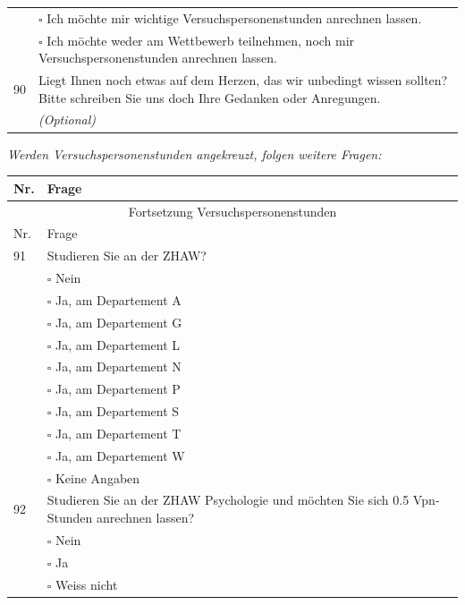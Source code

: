 \begin{flushleft}
\begin{longtable}[c]{ |p{1em}|p{35em}|}
  & $\square$ Ich möchte mir wichtige Versuchspersonenstunden anrechnen lassen.\\
  
  & $\square$ Ich möchte weder am Wettbewerb teilnehmen, noch mir Versuchspersonenstunden anrechnen lassen.\\
  
  90 & Liegt Ihnen noch etwas auf dem Herzen, das wir unbedingt wissen sollten? Bitte schreiben Sie uns doch Ihre Gedanken oder Anregungen.\\
  & \textit{(Optional)}\\
\end{longtable}

\textit{Werden Versuchspersonenstunden angekreuzt, folgen weitere Fragen:}

\begin{longtable}[c]{ |p{1em}|p{35em}|} 
  \hline
  Nr. & \multicolumn{1}{|l|}{Frage} \\
  \hline
  \endfirsthead
 
  \hline
  \multicolumn{2}{|c|}{ Fortsetzung Versuchspersonenstunden}\\
  \hline
  Nr. & \multicolumn{1}{|l|}{Frage} \\
  \hline
  \endhead
 
  \hline
  \endfoot
 
  \hline\hline
  \endlastfoot
  
  91 & Studieren Sie an der ZHAW?\\
  &$\square$ Nein\\
  &$\square$ Ja, am Departement A\\
  &$\square$ Ja, am Departement G\\
  &$\square$ Ja, am Departement L\\
  &$\square$ Ja, am Departement N\\
  &$\square$ Ja, am Departement P\\
  &$\square$ Ja, am Departement S\\
  &$\square$ Ja, am Departement T\\
  &$\square$ Ja, am Departement W\\
  &$\square$ Keine Angaben\\
  
  92 & Studieren Sie an der ZHAW Psychologie und möchten Sie sich 0.5 Vpn­Stunden anrechnen lassen?\\
  &$\square$ Nein\\
  &$\square$ Ja\\
  &$\square$ Weiss nicht\\
  

\end{longtable}
\end{flushleft}
